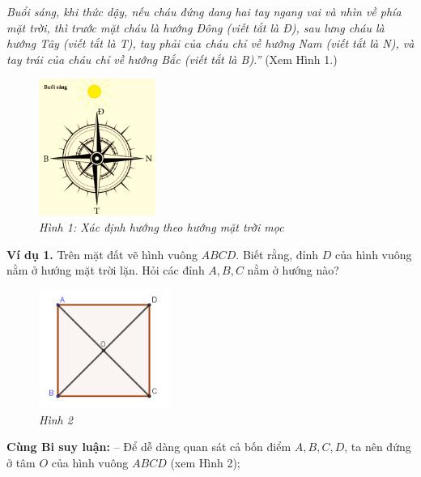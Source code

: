 	\begin{multicols}{2}
		\textit{Buổi sáng, khi thức dậy, nếu cháu đứng dang hai tay ngang vai và nhìn về phía mặt trời, thì trước mặt cháu là hướng Đông (viết tắt là \textnormal{Đ}), sau lưng cháu là hướng Tây (viết tắt là \textnormal{T}), tay phải của cháu chỉ về hướng Nam (viết tắt là \textnormal{N}), và tay trái của cháu chỉ về hướng Bắc (viết tắt là \textnormal{B}).”} (Xem Hình 1.)
	\begin{figure}[H]
	\centering
	\vspace*{-12pt}
	\captionsetup{labelformat= empty, justification=centering}
	\includegraphics[width=0.34\textwidth]{pic1}
	\caption{\small\textit{Hình 1: Xác định hướng theo hướng mặt trời mọc}}
	\vspace*{-4pt}
\end{figure}
	\end{multicols}
	\textbf{Ví dụ 1.} Trên mặt đất vẽ hình vuông $ABCD$. Biết rằng, đỉnh $D$ của hình vuông nằm ở hướng mặt trời lặn. Hỏi các đỉnh $A, B, C$ nằm ở  hướng nào?
	\vskip 0.1cm
	\begin{figure}
		\centering
		\vspace*{-15pt}
		\captionsetup{labelformat= empty, justification=centering}
		\includegraphics[width=0.38\textwidth]{pic2}
		\caption{\small\textit{Hình 2}}
		\vspace*{-20pt}
	\end{figure}
	\textbf{Cùng Bi suy luận:}
	\vskip 0.1cm
	-- Để dễ dàng quan sát cả bốn điểm $A, B, C, D$, ta nên đứng ở tâm $O$ của hình vuông $ABCD$ (xem Hình 2);

